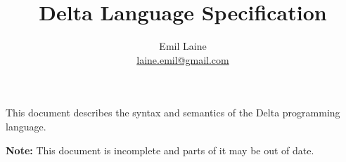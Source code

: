\documentclass[oneside]{memoir}
\begin{document}
\title{Delta Language Specification}
\author{Emil Laine \\ \href{mailto:laine.emil@gmail.com}{laine.emil@gmail.com}}
\maketitle

This document describes the syntax and semantics of the Delta programming language.

\textbf{Note:} This document is incomplete and parts of it may be out of date.

\tableofcontents







\end{document}
